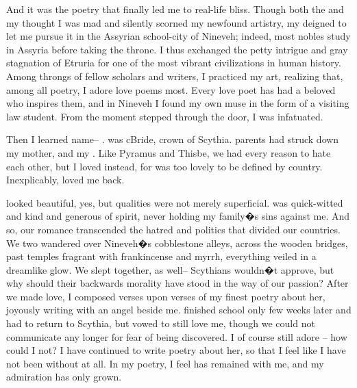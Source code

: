 \documentclass[char]{Kos}
\begin{document}
And it was the poetry that finally led me to real-life bliss. Though both the \cEtruriaKing{\monarch} and my \cGroom{\nickname} thought I was mad and silently scorned my newfound artistry, my \cEtruriaKing{\parent} deigned to let me pursue it in the Assyrian school-city of Nineveh; indeed, most nobles study in Assyria before taking the throne. I thus exchanged the petty intrigue and gray stagnation of Etruria for one of the most vibrant civilizations in human history. Among throngs of fellow scholars and writers, I practiced my art, realizing that, among all poetry, I adore love poems most. Every love poet has had a beloved who inspires them, and in Nineveh I found my own muse in the form of a visiting law student. From the moment \cBride{\they} stepped through the door, I was infatuated.

Then I learned \cBride{\their} name-- \cBride{\nickname}. \cBride{\They} was cBride{\nickname}, crown \cBride{\prince} of Scythia. \cBride{\Their} parents had struck down my mother, and my \cEtruriaKing{\parent} \cBride{\their} \cFugitive{\sibling}. Like Pyramus and Thisbe, we had every reason to hate each other, but I loved \cBride{\them} instead, for \cBride{\they} was too lovely to be defined by \cBride{\their} country. Inexplicably, \cBride{\they} loved me back.

\cBride{\nickname} looked beautiful, yes, but \cBride{\their} qualities were not merely superficial. \cBride{\They} was quick-witted and kind and generous of spirit, never holding my family�s sins against me. And so, our romance transcended the hatred and politics that divided our countries. We two wandered over Nineveh�s cobblestone alleys, across the wooden bridges, past temples fragrant with frankincense and myrrh, everything veiled in a dreamlike glow. We slept together, as well-- Scythians wouldn�t approve, but why should their backwards morality have stood in the way of our passion? After we made love, I composed verses upon verses of my finest poetry about her, joyously writing with an angel beside me. \cBride{\They} finished school only few weeks later and had to return to Scythia, but \cBride{\they} vowed to still love me, though we could not communicate any longer for fear of being discovered. I of course still adore \cBride{\them}-- how could I not? I have continued to write poetry about her, so that I feel like I have not been without \cBride{\them} at all. In my poetry, I feel \cBride{\they} has remained with me, and my admiration has only grown.
\end{document}
